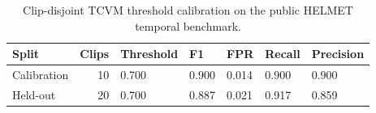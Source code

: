 \begin{table}[t]
\caption{Clip-disjoint TCVM threshold calibration on the public HELMET temporal benchmark.}
\label{tab:tcvm_calibration_protocol}
\small
\setlength{\tabcolsep}{4pt}
\begin{tabular}{lrlllll}
\toprule
Split & Clips & Threshold & F1 & FPR & Recall & Precision \\
\midrule
Calibration & 10 & 0.700 & 0.900 & 0.014 & 0.900 & 0.900 \\
Held-out & 20 & 0.700 & 0.887 & 0.021 & 0.917 & 0.859 \\
\bottomrule
\end{tabular}
\end{table}
